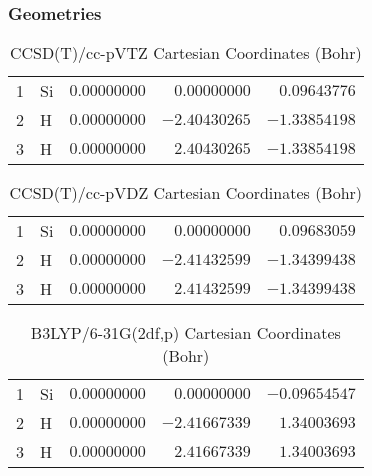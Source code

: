 \documentclass[10pt,oneside]{article}
\begin{document}
\clearpage

\subsection{\ \ \ }

\subsubsection*{Geometries}
\begin{table}[h!]
\centering
\caption{CCSD(T)/cc-pVTZ Cartesian Coordinates (Bohr)}
\begin{tabular}{llrrr}
1  & Si & $ 0.00000000$ & $ 0.00000000$ & $ 0.09643776$ \\
2  & H  & $ 0.00000000$ & $-2.40430265$ & $-1.33854198$ \\
3  & H  & $ 0.00000000$ & $ 2.40430265$ & $-1.33854198$ \\
\end{tabular}
\end{table}

\begin{table}[h!]
\centering
\caption{CCSD(T)/cc-pVDZ Cartesian Coordinates (Bohr)}
\begin{tabular}{llrrr}
1  & Si & $ 0.00000000$ & $ 0.00000000$ & $ 0.09683059$ \\
2  & H  & $ 0.00000000$ & $-2.41432599$ & $-1.34399438$ \\
3  & H  & $ 0.00000000$ & $ 2.41432599$ & $-1.34399438$ \\
\end{tabular}
\end{table}

\begin{table}[h!]
\centering
\caption{B3LYP/6-31G(2df,p) Cartesian Coordinates (Bohr)}
\begin{tabular}{llrrr}
1  & Si & $ 0.00000000$ & $ 0.00000000$ & $-0.09654547$ \\
2  & H  & $ 0.00000000$ & $-2.41667339$ & $ 1.34003693$ \\
3  & H  & $ 0.00000000$ & $ 2.41667339$ & $ 1.34003693$ \\
\end{tabular}
\end{table}

\clearpage
\end{document}
